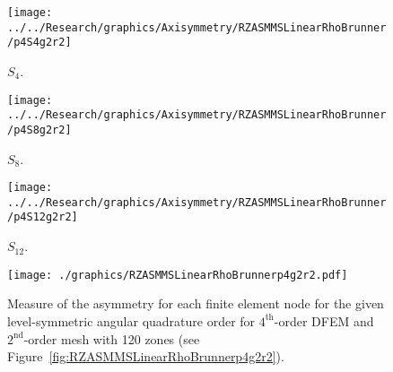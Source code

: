 \documentclass[12pt]{article}
\begin{document}
\begin{sidewaysfigure}[!htb]
\centering
\begin{subfigure}{0.33\textwidth}
\texttt{[image: ../../Research/graphics/Axisymmetry/RZASMMSLinearRhoBrunner/p4S4g2r2]}
\caption{$S_4$.}
\end{subfigure}%
\begin{subfigure}{0.33\textwidth}
\texttt{[image: ../../Research/graphics/Axisymmetry/RZASMMSLinearRhoBrunner/p4S8g2r2]}
\caption{$S_8$.}
\end{subfigure}%
\begin{subfigure}{0.33\textwidth}
\texttt{[image: ../../Research/graphics/Axisymmetry/RZASMMSLinearRhoBrunner/p4S12g2r2]}
\caption{$S_{12}$.}
\end{subfigure}
\caption{Relative asymmetry for $4^\text{th}$-order finite elements on a $2^\text{nd}$-order mesh for given order of level-symmetric angular quadrature.}
\label{fig:RZASMMSLinearRhoBrunnerp4g2r2}
\end{sidewaysfigure}

\begin{figure}[!htb]
\centering
\texttt{[image: ./graphics/RZASMMSLinearRhoBrunnerp4g2r2.pdf]}
\caption{Measure of the asymmetry for each finite element node for the given level-symmetric angular quadrature order for $4^\text{th}$-order DFEM and $2^\text{nd}$-order mesh with 120 zones (see Figure~\ref{fig:RZASMMSLinearRhoBrunnerp4g2r2}).}
\label{fig:RZASMMSLinearRhoBrunnerp4g2r2Nodes}
\end{figure}
\end{document}
